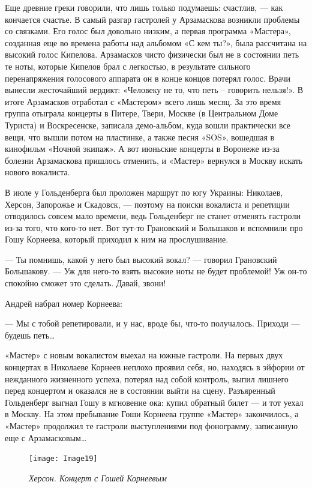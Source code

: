 \documentclass[16pt,a5paper,oneside]{book}
\begin{document}
Еще древние греки говорили, что лишь только подумаешь: счастлив, — как кончается счастье. В самый разгар гастролей у
Арзамаскова возникли проблемы со связками. Его голос был довольно низким, а первая программа «Мастера», созданная еще во
времена работы над альбомом «С кем ты?», была рассчитана на высокий голос Кипелова. Арзамасков чисто физически был не в
состоянии петь те ноты, которые Кипелов брал с легкостью, в результате сильного перенапряжения голосового аппарата он в
конце концов потерял голос. Врачи вынесли жесточайший вердикт: «Человеку не то, что петь – говорить нельзя!». В итоге
Арзамасков отработал с «Мастером» всего лишь месяц. За это время группа отыграла концерты в Питере, Твери, Москве (в
Центральном Доме Туриста) и Воскресенске, записала демо-альбом, куда вошли практически все вещи, что вышли потом на
пластинке, а также песня «SOS», вошедшая в кинофильм «Ночной экипаж». А вот июньские концерты в Воронеже из-за болезни
Арзамаскова пришлось отменить, и «Мастер» вернулся в Москву искать нового вокалиста.

В июле у Гольденберга был проложен маршрут по югу Украины: Николаев, Херсон, Запорожье и Скадовск, — поэтому на поиски
вокалиста и репетиции отводилось совсем мало времени, ведь Гольденберг не станет отменять гастроли из-за того, что
кого-то нет. Вот тут-то Грановский и Большаков и вспомнили про Гошу Корнеева, который приходил к ним на прослушивание.

— Ты помнишь, какой у него был высокий вокал? — говорил Грановский Большакову. — Уж для него-то взять высокие ноты не
будет проблемой! Уж он-то спокойно сможет это сделать. Давай, звони!

Андрей набрал номер Корнеева:

— Мы с тобой репетировали, и у нас, вроде бы, что-то получалось. Приходи — будешь петь\ldots

«Мастер» с новым вокалистом выехал на южные гастроли. На первых двух концертах в Николаеве Корнеев неплохо проявил себя,
но, находясь в эйфории от нежданного жизненного успеха, потерял над собой контроль, выпил лишнего перед концертом и
оказался не в состоянии выйти на сцену. Разъяренный Гольденберг выгнал Гошу в мгновение ока: купил обратный билет — и
тот уехал в Москву. На этом пребывание Гоши Корнеева группе «Мастер» закончилось, а «Мастер» продолжил те гастроли
выступлениями под фонограмму, записанную еще с Арзамасковым\ldots

\begin{figure}
    \centering
    \texttt{[image: Image19]}
    \caption{\textit{Херсон. Концерт с Гошей Корнеевым}}
\end{figure}
\end{document}
